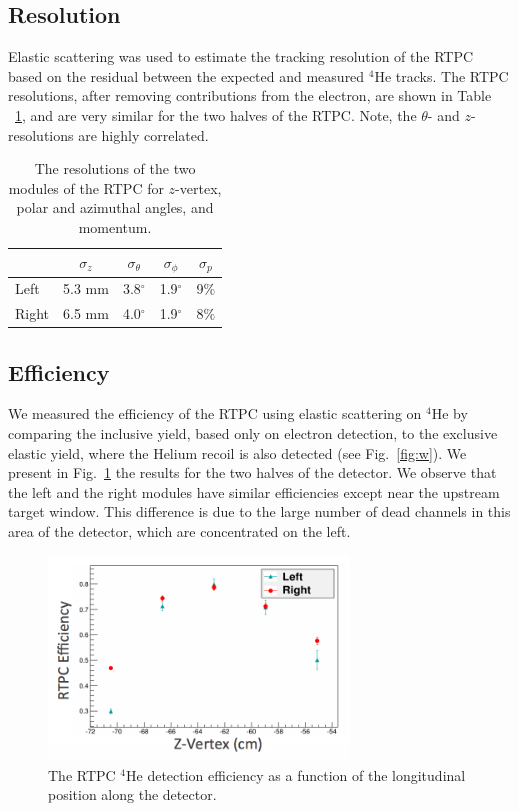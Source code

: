 \documentclass[preprint,5p]{elsarticle}
\begin{document}
\subsection{Resolution}
Elastic scattering was used to estimate the tracking resolution of the RTPC 
based on the residual between the expected and measured $^4$He tracks.  The RTPC
resolutions, after removing contributions from the electron, are shown in Table
~\ref{tab:reso}, and are very similar for the two halves of the RTPC.  Note, the
$\theta$- and $z$-resolutions are highly correlated.
\begin{table}[htbp]
\begin{center}
\begin{tabular}{|l|cccc|}
  \hline
& $\sigma_{z}$ &  $\sigma_{\theta}$ & $\sigma_{\phi}$ & $\sigma_{p}$\\
\hline
Left &  5.3 mm & 3.8$^{\circ}$ & 1.9$^{\circ}$ & 9$\%$ \\
Right & 6.5 mm & 4.0$^{\circ}$ & 1.9$^{\circ}$ & 8$\%$\\
\hline
\end{tabular}
\caption{The resolutions of the two modules of the RTPC for $z$-vertex, polar and azimuthal angles, and momentum.}
\label{tab:reso}
\end{center}
\end{table}


\subsection{Efficiency}
We measured the efficiency of the RTPC
using elastic scattering on $^4$He by comparing the inclusive yield, based
only on electron detection, to the exclusive elastic yield, where the Helium
recoil is also detected (see Fig.~\ref{fig:w}). We present in Fig.~\ref{fig:rtpc_eff}
the results for the two halves of the detector. We observe that the left and 
the right modules have similar efficiencies except near the upstream target 
window. This difference is due to the large number of dead channels in this 
area of the detector, which are concentrated on the left.

\begin{figure}[tb]
\centering
\includegraphics[width=8cm]{fig/tpceff.png}
\caption{The RTPC $^4$He detection efficiency as a function of the longitudinal 
   position along the detector.
 \label{fig:rtpc_eff}}
 \end{figure}
\end{document}
